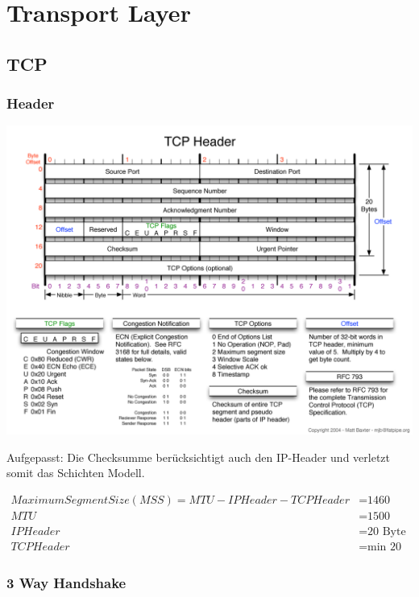 \section{Transport Layer}


\subsection{TCP}

\subsubsection{Header}

\includegraphics[width=\textwidth]{media/TCPHeader.png}

Aufgepasst: Die Checksumme berücksichtigt auch den IP-Header und verletzt somit
das Schichten Modell.

\begin{align*}
	Maximum Segment Size (MSS) = MTU - IPHeader - TCP Header & = \textrm{1460 Byte}\\
	MTU &= \textrm{1500 Byte}\\
	IPHeader &= \textrm{20 Byte}\\
	TCPHeader &= \textrm{min 20 Byte}
\end{align*}

\subsubsection{3 Way Handshake}

